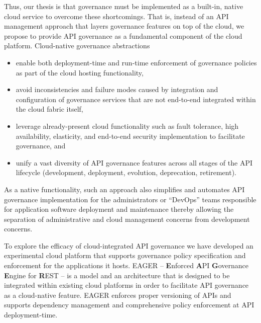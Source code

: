 Thus, our thesis is that governance must be implemented as a built-in, native
cloud service to
overcome these shortcomings.
That is, instead of an API management
approach that layers governance features on top of the cloud, 
we propose to provide API governance as a fundamental component of the cloud
platform.  Cloud-native governance abstractions
\begin{itemize}
\item enable both deployment-time and run-time enforcement of governance
policies as part of the cloud hosting functionality,
\item avoid inconsistencies and failure modes caused  
by integration and configuration of governance services that are not
end-to-end integrated within the cloud fabric itself, 
\item leverage already-present cloud functionality such as fault tolerance,
high availability, elasticity, and end-to-end security implementation to
facilitate governance, and
\item unify a vast diversity of API
governance features across all stages of the API lifecycle
(development, deployment, evolution, deprecation, retirement). 
\end{itemize}
As a native functionality, such an
approach also simplifies and automates API governance implementation for
the administrators or ``DevOps'' teams responsible for application
software deployment and
maintenance thereby allowing the separation of administrative and
cloud management concerns from development concerns.

To explore the efficacy of cloud-integrated API governance we have developed
an experimental cloud platform that supports governance policy specification
and enforcement for the applications it hosts. 
EAGER -- {\bf E}nforced {\bf A}PI {\bf G}overnance
{\bf E}ngine for {\bf R}EST -- is a model and an architecture that is designed
to be integrated within existing
cloud platforms in order to facilitate API governance as a 
cloud-native feature. EAGER enforces proper versioning of APIs and supports dependency 
management and comprehensive policy enforcement at API deployment-time. 

